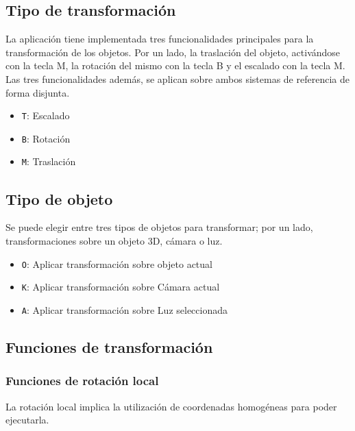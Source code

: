 \documentclass[12pt,a4paper]{article}
\begin{document}
\subsection{Tipo de transformación}

La aplicación tiene implementada tres funcionalidades principales para la transformación de los objetos. Por un lado, la traslación del objeto, activándose con la tecla M, la rotación del mismo con la tecla B y el escalado con la tecla M. Las tres funcionalidades además, se aplican sobre ambos sistemas de referencia de forma disjunta.

\begin{itemize}
  \item \texttt{T}: Escalado
  \item \texttt{B}: Rotación
  \item \texttt{M}: Traslación
\end{itemize}

\subsection{Tipo de objeto}

Se puede elegir entre tres tipos de objetos para transformar; por un lado, transformaciones sobre un objeto 3D, cámara o luz.

\begin{itemize}
  \item \texttt{O}: Aplicar transformación sobre objeto actual
  \item \texttt{K}: Aplicar transformación sobre Cámara actual
  \item \texttt{A}: Aplicar transformación sobre Luz seleccionada
\end{itemize}


\subsection{Funciones de transformación}

\subsubsection{Funciones de rotación local}

La rotación local implica la utilización de coordenadas homogéneas para poder ejecutarla.
\end{document}
